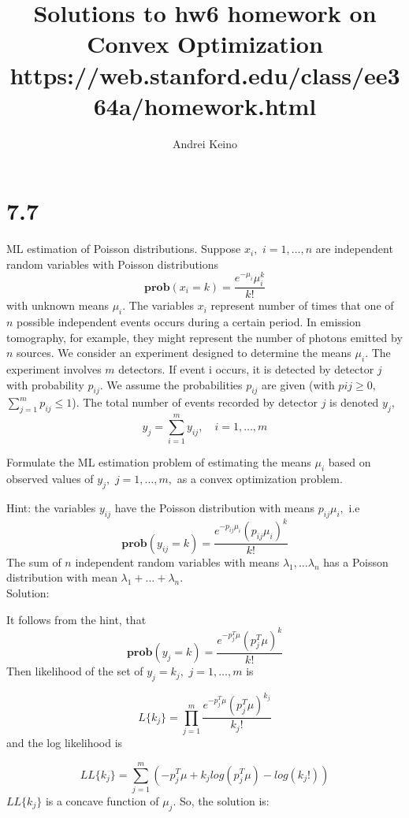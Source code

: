\documentclass{article}
\begin{document}
\title{Solutions to hw6 homework on Convex Optimization https://web.stanford.edu/class/ee364a/homework.html}
\author{Andrei Keino}
\maketitle


\section*{7.7}
ML estimation of Poisson distributions. Suppose $x_i,$ $i = 1, \dots , n$ are independent random variables with Poisson distributions 
$$
\boldsymbol{prob}(x_i = k) = \frac{e^{-\mu_i} \mu_i^k}{k!}
$$
with unknown means $\mu_i.$ The variables $x_i$ represent number of times that one of $n$ possible independent events occurs during a certain period. In emission tomography, for
example, they might represent the number of photons emitted by $n$ sources. We consider an experiment designed to determine the means $\mu_i.$ The experiment involves $m$ detectors. If event i occurs, it is detected by detector $j$ with probability $p_{ij}.$ We assume
the probabilities $p_{ij}$ are given (with $p{ij} \geq 0,$ 
$\sum_{j =1}^{m}p_{ij} \leq 1$). The total number of events
recorded by detector $j$ is denoted $y_j$,
$$
y_j = \sum_{i = 1}^{m} y_{ij}, \quad i = 1, \dots , m
$$

Formulate the ML estimation problem of estimating the means 
$\mu_i$ based on observed values of $y_j,$ $j = 1, \dots ,m,$ as
 a convex optimization problem.
 
 Hint: the variables $y_{ij}$ have the Poisson distribution with means $p_{ij} \mu_i, $ i.e 
$$
\boldsymbol{prob}(y_{ij} = k) = 
\frac{e^{-p_{ij}\mu_i} (p_{ij} \mu_i)^k}{k!}
$$
The sum of $n$ independent random variables with means 
$\lambda_1, \dots \lambda_n$ has a Poisson distribution with mean $\lambda_1 +  \dots + \lambda_n.$\\

Solution:

It follows from the hint, that 
$$
\boldsymbol{prob}(y_j = k) = 
\frac{e^{-p_j^T \mu} (p_j^T\mu)^k}{k!}
$$
Then likelihood of the set of $y_j = k_j,$ $j = 1, \dots , m$ is 

$$
L\{k_j\} = 
\prod_{j = 1}^{m}\frac{e^{-p_j^T \mu} (p_j^T\mu)^{k_j}}{k_j!}
$$
and the log likelihood is

$$
LL\{k_j\} = 
\sum_{j = 1}^{m}(-p_j^T \mu + k_j log(p_j^T\mu) - log(k_j!))
$$
$LL\{k_j\}$ is a concave function of $\mu_j.$ So, 
 the solution is:
\end{document}
